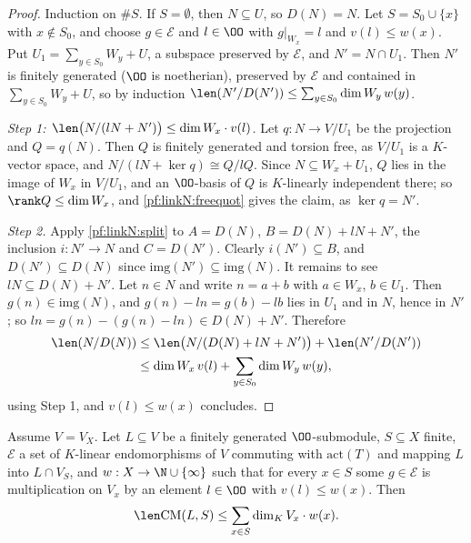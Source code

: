 \begin{proof}
Induction on $\#S$. If $S=\emptyset$, then $N\subseteq U$, so $D(N)=N$. Let $S=S_0\cup\{x\}$ with $x\notin S_0$, and choose $g\in\mathcal E$ and
$l\in\OO$ with $g|_{W_x}=l$ and $v(l)\le w(x)$. Put $U_1=\sum_{y\in S_0}W_y+U$, a subspace preserved by $\mathcal E$, and $N'=N\cap U_1$. Then
$N'$ is finitely generated ($\OO$ is noetherian), preserved by $\mathcal E$ and contained in $\sum_{y\in S_0}W_y+U$, so by induction
$\len(N'/D(N'))\le\sum_{y\in S_0}\dim W_y\,w(y)$.

\emph{Step 1: $\len\bigl(N/(lN+N')\bigr)\le\dim W_x\cdot v(l)$.} Let $q:N\to V/U_1$ be the projection and $Q=q(N)$. Then $Q$ is finitely generated
and torsion free, as $V/U_1$ is a $K$-vector space, and $N/(lN+\ker q)\cong Q/lQ$. Since $N\subseteq W_x+U_1$, $Q$ lies in the image of $W_x$
in $V/U_1$, and an $\OO$-basis of $Q$ is $K$-linearly independent there; so $\rank Q\le\dim W_x$, and \cref{pf:linkN:freequot} gives the
claim, as $\ker q=N'$.

\emph{Step 2.} Apply \cref{pf:linkN:split} to $A=D(N)$, $B=D(N)+lN+N'$, the inclusion $i:N'\to N$ and $C=D(N')$. Clearly $i(N')\subseteq B$, and
$D(N')\subseteq D(N)$ since $\mathrm{img}(N')\subseteq\mathrm{img}(N)$. It remains to see $lN\subseteq D(N)+N'$. Let $n\in N$ and write
$n=a+b$ with $a\in W_x$, $b\in U_1$. Then $g(n)\in\mathrm{img}(N)$, and $g(n)-ln=g(b)-lb$ lies in $U_1$ and in $N$, hence in $N'$; so
$ln=g(n)-(g(n)-ln)\in D(N)+N'$. Therefore
\begin{align*}
\len(N/D(N))&\le\len\bigl(N/(D(N)+lN+N')\bigr)+\len(N'/D(N'))\\
&\le\dim W_x\,v(l)+\sum_{y\in S_0}\dim W_y\,w(y),
\end{align*}
using Step 1, and $v(l)\le w(x)$ concludes.
\end{proof}

\begin{theorem}\label{pf:linkN:congmodle}
Assume $V=V_X$. Let $L\subseteq V$ be a finitely generated $\OO$-submodule, $S\subseteq X$ finite, $\mathcal E$ a set of $K$-linear
endomorphisms of $V$ commuting with $\mathrm{act}(T)$ and mapping $L$ into $L\cap V_S$, and $w:X\to\N\cup\{\infty\}$ such that for every $x\in S$
some $g\in\mathcal E$ is multiplication on $V_x$ by an element $l\in\OO$ with $v(l)\le w(x)$. Then
\[
\len\mathrm{CM}(L,S)\le\sum_{x\in S}\dim_KV_x\cdot w(x).
\]
\end{theorem}

